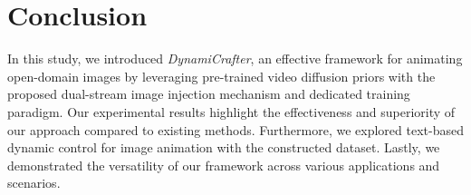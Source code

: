 \section{Conclusion}
In this study, we introduced \emph{DynamiCrafter}, an effective framework for animating open-domain images by leveraging pre-trained video diffusion priors with the proposed dual-stream image injection mechanism and dedicated training paradigm. Our experimental results highlight the effectiveness and superiority of our approach compared to existing methods. 
Furthermore, we explored text-based dynamic control for image animation with the constructed dataset. Lastly, we demonstrated the versatility of our framework across various applications and scenarios.